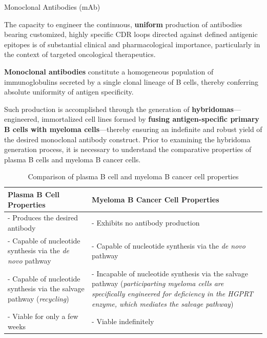     \begin{core}{Monoclonal Antibodies (mAb)}

      The capacity to engineer the continuous, \textbf{uniform} production of antibodies bearing customized, highly specific CDR loops directed against defined antigenic epitopes is of substantial clinical and pharmacological importance, particularly in the context of targeted oncological therapeutics.

      \textbf{Monoclonal antibodies} constitute a homogeneous population of immunoglobulins secreted by a single clonal lineage of B cells, thereby conferring absolute uniformity of antigen specificity.

      Such production is accomplished through the generation of \textbf{hybridomas}---engineered, immortalized cell lines formed by \textbf{fusing antigen-specific primary B cells with myeloma cells}---thereby ensuring an indefinite and robust yield of the desired monoclonal antibody construct. Prior to examining the hybridoma generation process, it is necessary to understand the comparative properties of plasma B cells and myeloma B cancer cells.

      \begin{table}[H]
        \centering
        \begin{tabular}{p{6.5cm}p{6.5cm}}
          \hline
          \textbf{Plasma B Cell Properties} & \textbf{Myeloma B Cancer Cell Properties} \\
          \hline
          - Produces the desired antibody &
          - Exhibits no antibody production \\
          - Capable of nucleotide synthesis via the \textit{de novo} pathway &
          - Capable of nucleotide synthesis via the \textit{de novo} pathway \\
          - Capable of nucleotide synthesis via the salvage pathway (\textit{recycling}) &
          - Incapable of nucleotide synthesis via the salvage pathway (\textit{participarting myeloma cells are specifically engineered for deficiency in the HGPRT enzyme, which mediates the salvage pathway}) \\
          - Viable for only a few weeks &
          - Viable indefinitely \\
          \hline
        \end{tabular}
        \caption{Comparison of plasma B cell and myeloma B cancer cell properties}
        \label{tab:plasma_vs_myeloma}
      \end{table}
      \vspace{-0.3cm}


\end{core}
